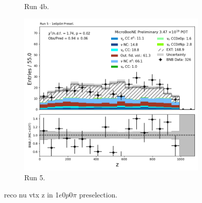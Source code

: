 \begin{figure}[H]
\begin{subfigure}[t]{0.32\linewidth}
        \caption{Run 4b.}
    \end{subfigure}%
    \hspace{0.2cm}%
    \begin{subfigure}[t]{0.32\linewidth}
        \includegraphics[width=\linewidth]{technote/Appendix_Preselection/Figures/1e0p0pi/Run5/reco_nu_vtx_z_Run5_1e0p0pi_Presel.png}
        \caption{Run 5.}
    \end{subfigure}
    \caption{reco nu vtx z in 1$e$0$p$0$\pi$ preselection.}
\end{figure}

